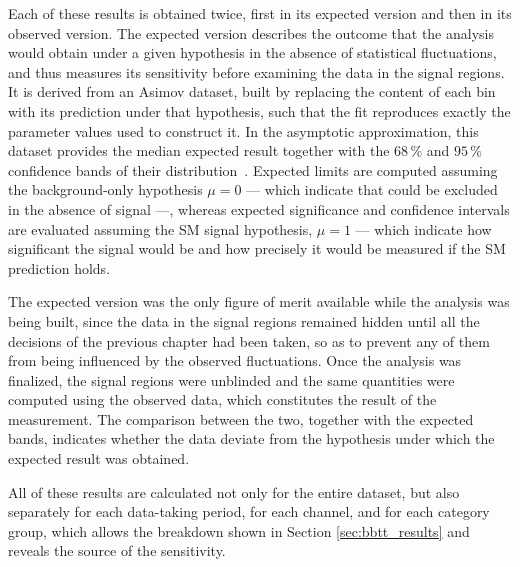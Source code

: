 Each of these results is obtained twice, first in its expected version and then in its observed version. The expected version describes the outcome that the analysis would obtain under a given hypothesis in the absence of statistical fluctuations, and thus measures its sensitivity before examining the data in the signal regions. It is derived from an Asimov dataset, built by replacing the content of each bin with its prediction under that hypothesis, such that the fit reproduces exactly the parameter values used to construct it. In the asymptotic approximation, this dataset provides the median expected result together with the $68\,\%$ and $95\,\%$ confidence bands of their distribution~\cite{Cowan:2010js}. Expected limits are computed assuming the background-only hypothesis $\mu = 0$ — which indicate that could be excluded in the absence of signal —, whereas expected significance and confidence intervals are evaluated assuming the SM signal hypothesis, $\mu = 1$ — which indicate how significant the signal would be and how precisely it would be measured if the SM prediction holds.


The expected version was the only figure of merit available while the analysis was being built, since the data in the signal regions remained hidden until all the decisions of the previous chapter had been taken, so as to prevent any of them from being influenced by the observed fluctuations. Once the analysis was finalized, the signal regions were unblinded and the same quantities were computed using the observed data, which constitutes the result of the measurement. The comparison between the two, together with the expected bands, indicates whether the data deviate from the hypothesis under which the expected result was obtained.





All of these results are calculated not only for the entire dataset, but also separately for each data-taking period, for each channel, and for each category group, which allows the breakdown shown in Section \ref{sec:bbtt_results} and reveals the source of the sensitivity.\bigskip


